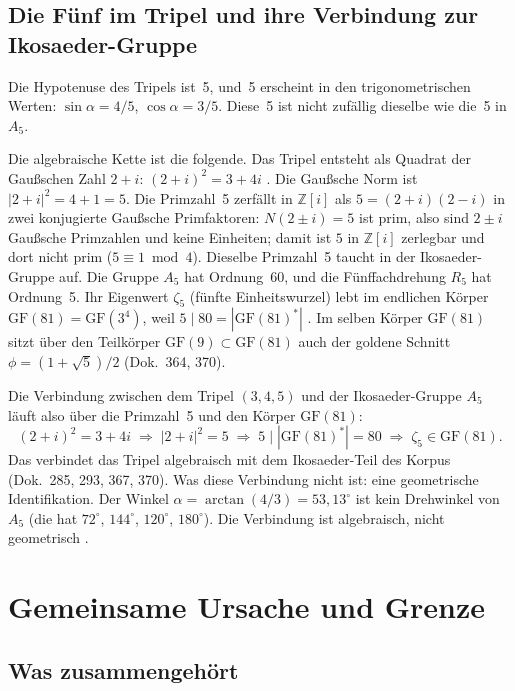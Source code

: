 \subsection{Die Fünf im Tripel und ihre Verbindung zur Ikosaeder-Gruppe \SM}

Die Hypotenuse des Tripels ist~5, und~5 erscheint in den trigonometrischen
Werten: $\sin\alpha = 4/5$, $\cos\alpha = 3/5$. Diese~5 ist nicht zufällig
dieselbe wie die~5 in $A_5$.

Die algebraische Kette ist die folgende. Das Tripel entsteht als Quadrat der
Gaußschen Zahl $2+i$: $(2+i)^2 = 3+4i$ \BM. Die Gaußsche Norm ist
$|2+i|^2 = 4+1 = 5$. Die Primzahl~5 zerfällt in $\mathbb Z[i]$ als
$5 = (2+i)(2-i)$ in zwei konjugierte Gaußsche Primfaktoren:
$N(2\pm i)=5$ ist prim, also sind $2\pm i$ Gaußsche Primzahlen und keine
Einheiten; damit ist $5$ in $\mathbb Z[i]$ zerlegbar und dort nicht prim
($5\equiv1\bmod4$). Dieselbe Primzahl~5
taucht in der Ikosaeder-Gruppe auf. Die Gruppe $A_5$ hat Ordnung~60, und die
Fünffachdrehung $R_5$ hat Ordnung~5. Ihr Eigenwert $\zeta_5$ (fünfte
Einheitswurzel) lebt im endlichen Körper $\mathrm{GF}(81) = \mathrm{GF}(3^4)$,
weil $5 \mid 80 = |\mathrm{GF}(81)^*|$ \BM. Im selben Körper $\mathrm{GF}(81)$
sitzt über den Teilkörper $\mathrm{GF}(9) \subset \mathrm{GF}(81)$ auch der
goldene Schnitt~$\phi = (1+\sqrt5)/2$ (Dok.~364, 370).

Die Verbindung zwischen dem Tripel $(3,4,5)$ und der Ikosaeder-Gruppe $A_5$
läuft also über die Primzahl~5 und den Körper $\mathrm{GF}(81)$:
\[
  (2+i)^2 = 3+4i \;\Longrightarrow\; |2+i|^2 = 5 \;\Longrightarrow\;
  5 \mid |\mathrm{GF}(81)^*| = 80 \;\Longrightarrow\; \zeta_5 \in \mathrm{GF}(81).
\]
Das verbindet das Tripel algebraisch mit dem Ikosaeder-Teil des Korpus
(Dok.~285, 293, 367, 370). Was diese Verbindung nicht ist: eine geometrische
Identifikation. Der Winkel $\alpha = \arctan(4/3) = 53{,}13^\circ$ ist kein
Drehwinkel von $A_5$ (die hat $72^\circ$, $144^\circ$, $120^\circ$,
$180^\circ$). Die Verbindung ist algebraisch, nicht geometrisch \SM.

\section{Gemeinsame Ursache und Grenze}
\label{sec:ursache}

\subsection{Was zusammengehört \SM}

